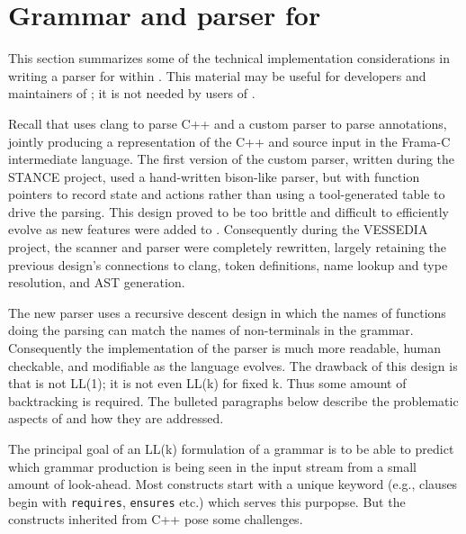 \newcommand{\lang}{C++\xspace}
\chapter{Grammar and parser for \acslpp}
\label{sec:grammar}

This section summarizes some of the technical implementation considerations in writing a parser for \acslpp within \fclang. 
This material may be useful for developers and maintainers of \fclang; it is not needed by users of \fclang.

Recall that \fclang uses clang to parse \lang and a custom parser to parse \acslpp annotations, jointly producing a representation of the \lang and \acslpp source input in the Frama-C intermediate language. 
The first version of the \acslpp custom parser, written during the STANCE project, used a hand-written bison-like parser, but with function pointers to record state and actions rather than using a tool-generated table to drive the parsing. 
This design proved to be too brittle and difficult to efficiently evolve as new features were added to \acslpp. 
Consequently during the VESSEDIA project, the scanner and parser were completely rewritten, largely retaining the previous design's connections to clang, token definitions, name lookup and type resolution, and AST generation.

The new parser uses a recursive descent design in which the names of functions doing the parsing can match the names of non-terminals in the grammar. 
Consequently the implementation of the parser is much more readable, human checkable, and modifiable as the \acslpp language evolves. 
The drawback of this design is that \acslpp is not LL(1); it is not even LL(k) for fixed k. 
Thus some amount of backtracking is required. 
The bulleted paragraphs below describe the problematic aspects of \acslpp and how they are addressed.

The principal goal of an LL(k) formulation of a grammar is to be able to predict which grammar production is being seen in the input stream from a small amount of look-ahead.
Most \acslpp constructs start with a unique keyword (e.g., clauses begin with \lstinline|requires|, \lstinline|ensures| etc.) which serves this purpopse. 
But the constructs inherited from \lang pose some challenges.

